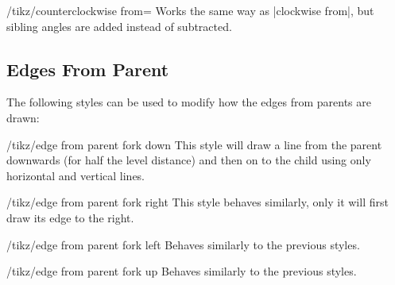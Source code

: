 \begin{key}{/tikz/counterclockwise from=}
    Works the same way as |clockwise from|, but sibling angles are added
    instead of subtracted.
\end{key}


\subsection{Edges From Parent}

The following styles can be used to modify how the edges from parents are
drawn:

\begin{stylekey}{/tikz/edge from parent fork down}
    This style will draw a line from the parent downwards (for half the level
    distance) and then on to the child using only horizontal and vertical
    lines.
\begin{codeexample}[preamble={\usetikzlibrary{trees}}]
\end{codeexample}
\end{stylekey}

\begin{stylekey}{/tikz/edge from parent fork right}
    This style behaves similarly, only it will first draw its edge to the
    right.
\begin{codeexample}[preamble={\usetikzlibrary{trees}}]
\end{codeexample}
\end{stylekey}

\begin{stylekey}{/tikz/edge from parent fork left}
    Behaves similarly to the previous styles.
\end{stylekey}

\begin{stylekey}{/tikz/edge from parent fork up}
    Behaves similarly to the previous styles.
\end{stylekey}


